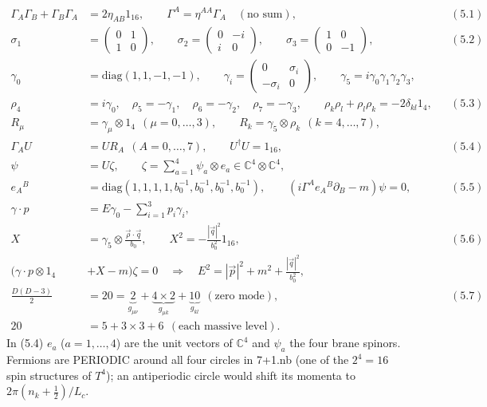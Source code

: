 \documentclass[10pt,a4paper]{article}
\begin{document}
\begin{align*}
\Gamma_A\Gamma_B+\Gamma_B\Gamma_A&=2\eta_{AB}1_{16},\qquad \Gamma^A=\eta^{AA}\Gamma_A\quad(\text{no sum}),&&(5.1) \\
\sigma_1&=\begin{pmatrix}0&1\\1&0\end{pmatrix},\qquad \sigma_2=\begin{pmatrix}0&-i\\i&0\end{pmatrix},\qquad \sigma_3=\begin{pmatrix}1&0\\0&-1\end{pmatrix},&&(5.2) \\
\gamma_0&=\mathrm{diag}(1,1,-1,-1),\qquad \gamma_i=\begin{pmatrix}0&\sigma_i\\-\sigma_i&0\end{pmatrix},\qquad \gamma_5=i\gamma_0\gamma_1\gamma_2\gamma_3, \\
\rho_4&=i\gamma_0,\quad \rho_5=-\gamma_1,\quad \rho_6=-\gamma_2,\quad \rho_7=-\gamma_3,\qquad \rho_k\rho_l+\rho_l\rho_k=-2\delta_{kl}1_4,&&(5.3) \\
R_\mu&=\gamma_\mu\otimes1_4\ \ (\mu=0,\dots,3),\qquad R_k=\gamma_5\otimes\rho_k\ \ (k=4,\dots,7), \\
\Gamma_AU&=UR_A\ \ (A=0,\dots,7),\qquad U^\dagger U=1_{16},&&(5.4) \\
\psi&=U\zeta,\qquad \zeta=\sum_{a=1}^4\psi_a\otimes e_a\in\mathbb C^4\otimes\mathbb C^4, \\
e_A{}^B&=\mathrm{diag}(1,1,1,1,b_0^{-1},b_0^{-1},b_0^{-1},b_0^{-1}),\qquad (i\Gamma^Ae_A{}^B\partial_B-m)\psi=0,&&(5.5) \\
\gamma\cdot p&=E\gamma_0-\sum_{i=1}^3p_i\gamma_i, \\
X&=\gamma_5\otimes\frac{\vec\rho\cdot\vec q}{b_0},\qquad X^2=-\frac{|\vec q|^2}{b_0^2}1_{16},&&(5.6) \\
(\gamma\cdot p\otimes1_4&+X-m)\zeta=0\quad\Rightarrow\quad E^2=|\vec p|^2+m^2+\frac{|\vec q|^2}{b_0^2}, \\
\frac{D(D-3)}2&=20=\underbrace{2}_{g_{\mu\nu}}+\underbrace{4\times2}_{g_{\mu k}}+\underbrace{10}_{g_{kl}}\ \ (\text{zero mode}),&&(5.7) \\
20&=5+3\times3+6\ \ (\text{each massive level}).
\end{align*}
In (5.4) $e_a$ ($a=1,\dots,4$) are the unit vectors of $\mathbb C^4$ and $\psi_a$ the four brane spinors. Fermions are PERIODIC around all four circles in 7+1.nb (one of the $2^4=16$ spin structures of $T^4$); an antiperiodic circle would shift its momenta to $2\pi(n_k+\frac12)/L_c$.
\end{document}
